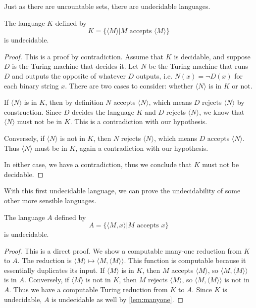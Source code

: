 Just as there are uncountable sets, there are undecidable languages.

\begin{theorem}
  The language $K$ defined by
  $$
  K = \{ \langle M \rangle | M \text{ accepts } \langle M \rangle \}
  $$
  is undecidable.
\end{theorem}
\begin{proof}
  This is a proof by contradiction.
  Assume that $K$ is decidable, and suppose $D$ is the Turing machine that decides it.
  Let $N$ be the Turing machine that runs $D$ and outputs the opposite of whatever $D$ outputs, i.e. $N(x) = \lnot D(x)$ for each binary string $x$.
  There are two cases to consider: whether $\langle N \rangle$ is in $K$ or not.

  If $\langle N \rangle$ is in $K$, then by definition $N$ accepts $\langle N \rangle$, which means $D$ rejects $\langle N \rangle$ by construction.
  Since $D$ decides the language $K$ and $D$ rejects $\langle N \rangle$, we know that $\langle N \rangle$ must not be in $K$.
  This is a contradiction with our hypothesis.

  Conversely, if $\langle N \rangle$ is not in $K$, then $N$ rejects $\langle N \rangle$, which means $D$ accepts $\langle N \rangle$.
  Thus $\langle N \rangle$ must be in $K$, again a contradiction with our hypothesis.

  In either case, we have a contradiction, thus we conclude that $K$ must not be decidable.
\end{proof}

With this first undecidable language, we can prove the undecidability of some other more sensible languages.

\begin{theorem}
  The language $A$ defined by
  $$
  A = \{ \langle M, x \rangle | M \text{ accepts } x\}
  $$
  is undecidable.
\end{theorem}
\begin{proof}
  This is a direct proof.
  We show a computable many-one reduction from $K$ to $A$.
  The reduction is $\langle M \rangle \mapsto \langle M, \langle M \rangle \rangle$.
  This function is computable because it essentially duplicates its input.
  If $\langle M \rangle$ is in $K$, then $M$ accepts $\langle M \rangle$, so $\langle M, \langle M \rangle \rangle$ is in $A$.
  Conversely, if $\langle M \rangle$ is not in $K$, then $M$ rejects $\langle M \rangle$, so $\langle M, \langle M \rangle \rangle$ is not in $A$.
  Thus we have a computable Turing reduction from $K$ to $A$.
  Since $K$ is undecidable, $A$ is undecidable as well by \autoref{lem:manyone}.
\end{proof}

